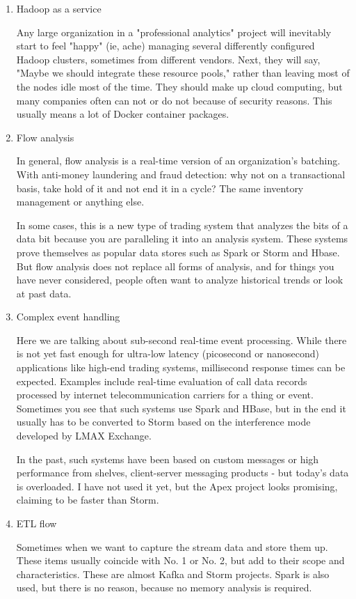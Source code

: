 \documentclass[sigconf]{acmart}
\begin{document}
\begin{enumerate}
  \item Hadoop as a service
  \par  Any large organization in a "professional analytics" project will inevitably start to feel "happy" (ie, ache) managing several differently configured Hadoop clusters, sometimes from different vendors.\cite{Zhou2017} Next, they will say, "Maybe we should integrate these resource pools," rather than leaving most of the nodes idle most of the time. They should make up cloud computing, but many companies often can not or do not because of security reasons. This usually means a lot of Docker container packages.

  \item   Flow analysis
  \par In general, flow analysis is a real-time version of an organization's batching.\cite{CF2017} With anti-money laundering and fraud detection: why not on a transactional basis, take hold of it and not end it in a cycle? The same inventory management or anything else.
  \par In some cases, this is a new type of trading system that analyzes the bits of a data bit because you are paralleling it into an analysis system. These systems prove themselves as popular data stores such as Spark or Storm and Hbase.\cite{Jain2016} But flow analysis does not replace all forms of analysis, and for things you have never considered, people often want to analyze historical trends or look at past data.

  \item Complex event handling
  \par  Here we are talking about sub-second real-time event processing. While there is not yet fast enough for ultra-low latency (picosecond or nanosecond) applications like high-end trading systems, millisecond response times can be expected.\cite{Zhou2017} Examples include real-time evaluation of call data records processed by internet telecommunication carriers for a thing or event. Sometimes you see that such systems use Spark and HBase, but in the end it usually has to be converted to Storm based on the interference mode developed by LMAX Exchange.\cite{Jain2016}
  \par  In the past, such systems have been based on custom messages or high performance from shelves, client-server messaging products - but today's data is overloaded. I have not used it yet, but the Apex project looks promising, claiming to be faster than Storm.

  \item ETL flow
  \par Sometimes when we want to capture the stream data and store them up. These items usually coincide with No. 1 or No. 2, but add to their scope and characteristics.\cite{Zhou2017} These are almost Kafka and Storm projects. Spark is also used, but there is no reason, because no memory analysis is required.


\end{enumerate}
\end{document}
